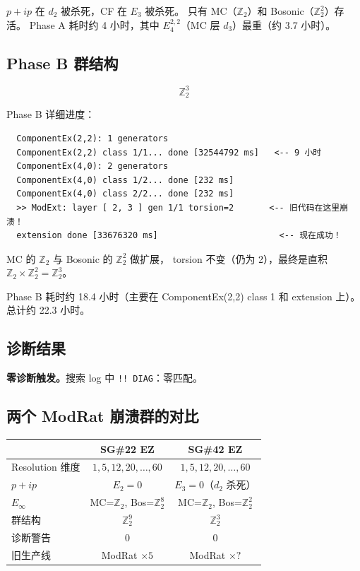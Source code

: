 \documentclass[a4paper,fontset=ubuntu,12pt]{ctexart}
\begin{document}
$p{+}ip$ 在 $d_2$ 被杀死，CF 在 $E_3$ 被杀死。
只有 MC（$\mathbb{Z}_2$）和 Bosonic（$\mathbb{Z}_2^2$）存活。
Phase A 耗时约 4 小时，其中 $E^{2,2}_4$（MC 层 $d_3$）最重（约 3.7 小时）。

\subsection{Phase B 群结构}

\[
\boxed{\mathbb{Z}_2^3}
\]

Phase B 详细进度：
\begin{verbatim}
  ComponentEx(2,2): 1 generators
  ComponentEx(2,2) class 1/1... done [32544792 ms]   <-- 9 小时
  ComponentEx(4,0): 2 generators
  ComponentEx(4,0) class 1/2... done [232 ms]
  ComponentEx(4,0) class 2/2... done [232 ms]
  >> ModExt: layer [ 2, 3 ] gen 1/1 torsion=2       <-- 旧代码在这里崩溃！
  extension done [33676320 ms]                        <-- 现在成功！
\end{verbatim}

MC 的 $\mathbb{Z}_2$ 与 Bosonic 的 $\mathbb{Z}_2^2$ 做扩展，
torsion 不变（仍为 2），最终是直积 $\mathbb{Z}_2 \times \mathbb{Z}_2^2 = \mathbb{Z}_2^3$。

Phase B 耗时约 18.4 小时（主要在 ComponentEx(2,2) class 1 和 extension 上）。
总计约 22.3 小时。

\subsection{诊断结果}

\textbf{零诊断触发。}搜索 log 中 \texttt{!! DIAG}：零匹配。

\subsection{两个 ModRat 崩溃群的对比}

\begin{center}
\begin{tabular}{l|cc}
\hline
& SG\#22 EZ & SG\#42 EZ \\
\hline
Resolution 维度 & $1,5,12,20,\ldots,60$ & $1,5,12,20,\ldots,60$ \\
$p{+}ip$ & $E_2 = 0$ & $E_3 = 0$（$d_2$ 杀死） \\
$E_\infty$ & MC=$\mathbb{Z}_2$, Bos=$\mathbb{Z}_2^8$
           & MC=$\mathbb{Z}_2$, Bos=$\mathbb{Z}_2^2$ \\
群结构 & $\mathbb{Z}_2^9$ & $\mathbb{Z}_2^3$ \\
诊断警告 & 0 & 0 \\
旧生产线 & ModRat $\times 5$ & ModRat $\times ?$ \\
\hline
\end{tabular}
\end{center}
\end{document}

